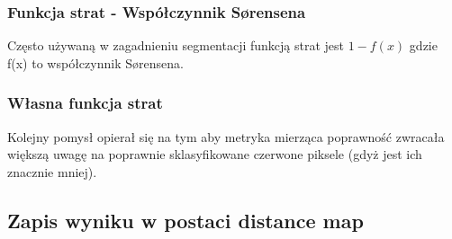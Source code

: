 \documentclass{article}
\begin{document}
\subsubsection{Funkcja strat - Współczynnik Sørensena}
Często używaną w zagadnieniu segmentacji funkcją strat jest $1-f(x)$ gdzie f(x) to współczynnik Sørensena.

\subsubsection{Własna funkcja strat}
Kolejny pomysł opierał się na tym aby metryka mierząca poprawność zwracała większą uwagę na poprawnie sklasyfikowane czerwone piksele (gdyż jest ich znacznie mniej).

\subsection{Zapis wyniku w postaci distance map}
\end{document}
